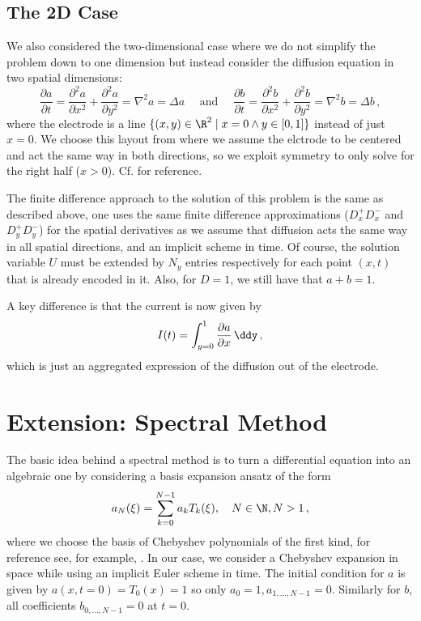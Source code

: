 \documentclass{prettytex/ox/mmsc-special-topic}
\begin{document}
  \subsection{The 2D Case}
  We also considered the two-dimensional case where we do not simplify the problem down to one dimension but instead consider the diffusion equation in two spatial dimensions:
  $$\frac{\partial a}{\partial t} = \frac{\partial^2 a}{\partial x^2} + \frac{\partial^2 a}{\partial y^2} = \nabla^2 a = \Delta a \quad\text{ and }\quad \frac{\partial b}{\partial t} = \frac{\partial^2 b}{\partial x^2} + \frac{\partial^2 b}{\partial y^2} = \nabla^2 b = \Delta b\,,$$
  where the electrode is a line $\{(x, y) \in \R^2 \;|\; x = 0 \wedge y \in [0, 1]\}$ instead of just $x = 0$.
  We choose this layout from  where we assume the elctrode to be centered and act the same way in both directions, so we exploit symmetry to only solve for the right half ($x > 0$).
  Cf.  for reference.

  The finite difference approach to the solution of this problem is the same as described above, one uses the same finite difference approximations ($D_x^+ D_x^-$ and $D_y^+ D_y^-$) for the spatial derivatives as we assume that diffusion acts the same way in all spatial directions, and an implicit scheme in time. Of course, the solution variable $U$ must be extended by $N_y$ entries respectively for each point $(x, t)$ that is already encoded in it.
  Also, for $D = 1$, we still have that $a + b = 1$.

  A key difference is that the current is now given by
  $$I(t) = \int_{y=0}^{1} \frac{\partial a}{\partial x} \,\ddy\,,$$
  which is just an aggregated expression of the diffusion out of the electrode.

  \section{Extension: Spectral Method}
  \label{sec:spectral-method}
  The basic idea behind a spectral method is to turn a differential equation into an algebraic one by considering a basis expansion ansatz of the form
  \begin{equation}
    a_N(\xi) = \sum_{k=0}^{N-1} a_k T_k(\xi),\quad N \in \N, N > 1\,,
    \label{eq:truncated-cheb-series}
  \end{equation}
  where we choose the basis of Chebyshev polynomials of the first kind, for reference see, for example, \cite{spectralmethods}.
  In our case, we consider a Chebyshev expansion in space while using an implicit Euler scheme in time.
  The initial condition for $a$ is given by $a(x, t=0) = T_0(x) = 1$ so only $a_0 = 1, a_{1, ..., N-1} = 0$. Similarly for $b$, all coefficients $b_{0, ..., N-1} = 0$ at $t = 0$.
\end{document}
